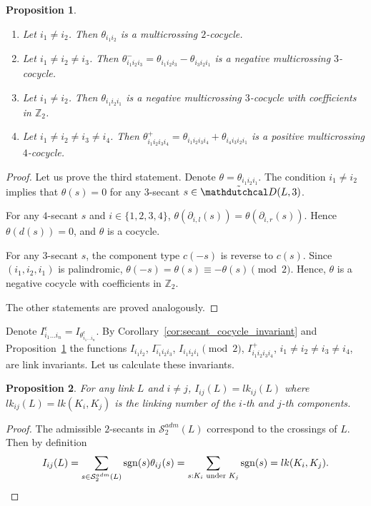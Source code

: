 \documentclass{article}
\newtheorem{proposition}{Proposition}
\theoremstyle{definition}
\theoremstyle{remark}
\def\Z{{\mathbb Z}}
\DeclareMathOperator{\sgn}{\mathrm{sgn}}
\begin{document}
\begin{proposition}\label{prop:component_secant_cocycles}
\begin{enumerate}
    \item Let $i_1\ne i_2$. Then $\theta_{i_1i_2}$ is a multicrossing $2$-cocycle.
    \item Let $i_1\ne i_2\ne i_3$. Then $\theta^-_{i_1 i_2 i_3}=\theta_{i_1i_2i_3}-\theta_{i_3i_2i_1}$ is a negative multicrossing $3$-cocycle.
    \item Let $i_1\ne i_2$. Then $\theta_{i_1i_2i_1}$ is a negative multicrossing $3$-cocycle with coefficients in $\Z_2$.
    \item Let $i_1\ne i_2\ne i_3\ne i_4$. Then $\theta^+_{i_1 i_2 i_3 i_4}=\theta_{i_1 i_2 i_3 i_4}+\theta_{i_4 i_3 i_2 i_1}$ is a positive multicrossing $4$-cocycle.
\end{enumerate}
\end{proposition}
\begin{proof}
Let us prove the third statement. Denote $\theta=\theta_{i_1i_2i_1}$. The condition $i_1\ne i_2$ implies that $\theta(s)=0$ for any $3$-secant $s\in\tilde{\mathdutchcal D}(L,3)$.

For any $4$-secant $s$ and $i\in\{1,2,3,4\}$, $\theta(\partial_{i,l}(s))=\theta(\partial_{i,r}(s))$. Hence $\theta(d(s))=0$, and $\theta$ is a cocycle.

For any $3$-secant $s$, the component type $c(-s)$ is reverse to $c(s)$. Since $(i_1,i_2,i_1)$ is palindromic, $\theta(-s)=\theta(s)\equiv-\theta(s)\pmod 2$. Hence, $\theta$ is a negative cocycle with coefficients in $\Z_2$.

The other statements are proved analogously.
\end{proof}

Denote $I^\epsilon_{i_1\dots i_n}=I_{\theta^\epsilon_{i_1\dots i_n}}$. By Corollary~\ref{cor:secant_cocycle_invariant} and Proposition~\ref{prop:component_secant_cocycles} the functions $I_{i_1i_2}$, $I^-_{i_1i_2i_3}$, $I_{i_1i_2i_1}\pmod 2$, $I^+_{i_1i_2i_3i_4}$, $i_1\ne i_2\ne i_3\ne i_4$, are link invariants. Let us calculate these invariants.

\begin{proposition}\label{prop:component_cocycle_ij}
 For any link $L$ and $i\ne j$,  $I_{ij}(L)=lk_{ij}(L)$ where $lk_{ij}(L)=lk(K_{i},K_{j})$ is the linking number of the $i$-th and $j$-th components.
\end{proposition}
\begin{proof}
    The admissible $2$-secants in $\mathcal S_2^{adm}(L)$ correspond to the crossings of $L$. Then by definition
\[
    I_{ij}(L)=\sum_{s\in\mathcal S^{adm}_2(L)}\sgn(s)\theta_{ij}(s)=
    \sum_{s: K_i{\scriptsize\mbox{ under }} K_j}\sgn(s)=lk(K_i,K_j).
\]
\end{proof}
\end{document}
